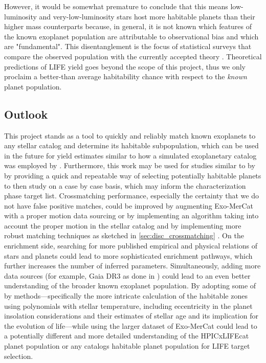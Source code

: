 However, it would be somewhat premature to conclude that this means low-luminosity and very-low-luminosity stars host more habitable planets than their higher mass counterparts because, in general, it is not known which features of the known exoplanet population are attributable to observational bias and which are "fundamental". This disentanglement is the focus of statistical surveys that compare the observed population with the currently accepted theory \cite{exoStats}. Theoretical predictions of LIFE yield goes beyond the scope of this project, thus we only proclaim a better-than average habitability chance with respect to the \textit{known} planet population.
\subsection{Outlook}
This project stands as a tool to quickly and reliably match known exoplanets to any stellar catalog and determine its habitable subpopulation, which can be used in the future for yield estimates similar to how a simulated exoplanetary catalog was employed by \textcite{life4}. Furthermore, this work may be used for studies similar to  by \textcite{Life10} by providing a quick and repeatable way of selecting potentially habitable planets to then study on a case by case basis, which may inform the characterization phase target list.
Crossmatching performance, especially the certainty that we do not have false positive matches, could be improved by augmenting Exo-MerCat with a proper motion data sourcing or by implementing an algorithm taking into account the proper motion in the stellar catalog and by implementing more robust matching techniques as sketched in \cref{sec:disc_crossmatching} .
On the enrichment side, searching for more published empirical and physical relations of stars and planets could lead to more sophisticated enrichment pathways, which further increases the number of inferred parameters. Simultaneously, adding more data sources (for example, Gaia DR3 as done in \cite{Bohl_2026}) could lead to an even better understanding of the broader known exoplanet population. 
By adopting some of  by \textcite{Bohl_2026} methods---specifically the more intricate calculation of the habitable zones using polynomials with stellar temperature,  including eccentricity in the planet insolation considerations and their estimates of stellar age and its implication for the evolution of life---while using the larger dataset of Exo-MerCat could lead to a potentially different and more detailed understanding of the HPICxLIFEcat planet population or any catalogs habitable planet population for LIFE target selection. 
